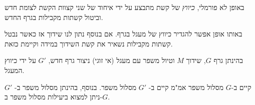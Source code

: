 באופן לא פורמלי,
\emph{כיווץ}
של קשת מתבצע על ידי איחוד של שני קצוות הקשת לצומת חדש וביטול קשתות מקבילות בגרף החדש.

באותו אופן אפשר להגדיר כיווץ של מעגל בגרף.
אם בנוסף נתון לנו שידוך אז כאשר נבטל קשתות מקבילות נשאיר את קשת השידוך במידה וקיימת כזאת.

בהינתן גרף $G$, שידוך $M$ וטיול משפר עם מעגל (אי זוגי) ניצור גרף חדש, 
$G'$
על ידי כיווץ המעגל.
\begin{claim}
קיים ב-$G$ מסלול משפר אמ"מ קיים ב-
$G'$
מסלול משפר.
בנוסף, בהינתן מסלול משפר ב-
$G'$
ניתן למצוא ביעילות מסלול משפר ב-$G$.
\end{claim}
